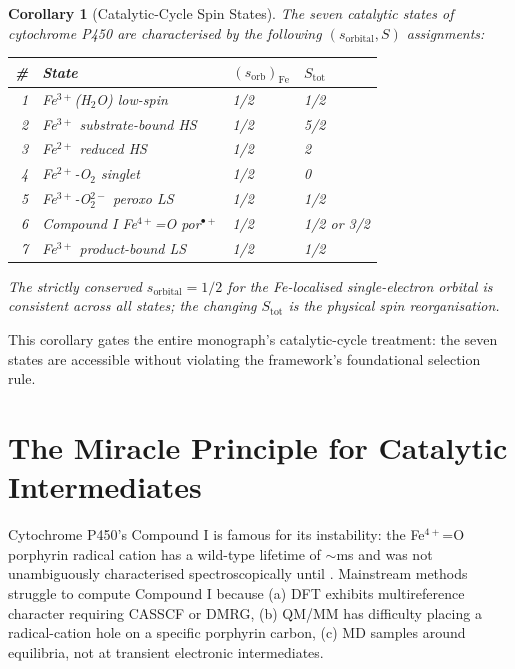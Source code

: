 \documentclass[11pt,twocolumn,a4paper]{article}
\newtheorem{corollary}[theorem]{Corollary}
\theoremstyle{definition}
\theoremstyle{remark}
\begin{document}
\begin{corollary}[Catalytic-Cycle Spin States]
\label{cor:cycle_spins}
The seven catalytic states of cytochrome P450 are characterised by the following $(s_{\mathrm{orbital}}, S)$ assignments:
\begin{center}
\small
\begin{tabular}{rlll}
\toprule
\# & State & $(s_{\mathrm{orb}})_{\mathrm{Fe}}$ & $S_{\mathrm{tot}}$ \\
\midrule
1 & Fe$^{3+}$(H$_2$O) low-spin & 1/2 & 1/2 \\
2 & Fe$^{3+}$ substrate-bound HS & 1/2 & 5/2 \\
3 & Fe$^{2+}$ reduced HS & 1/2 & 2 \\
4 & Fe$^{2+}$-O$_2$ singlet & 1/2 & 0 \\
5 & Fe$^{3+}$-O$_2^{2-}$ peroxo LS & 1/2 & 1/2 \\
6 & Compound I Fe$^{4+}$=O por$^{\bullet+}$ & 1/2 & 1/2 or 3/2 \\
7 & Fe$^{3+}$ product-bound LS & 1/2 & 1/2 \\
\bottomrule
\end{tabular}
\end{center}
The strictly conserved $s_{\mathrm{orbital}} = 1/2$ for the Fe-localised single-electron orbital is consistent across all states; the changing $S_{\mathrm{tot}}$ is the physical spin reorganisation.
\end{corollary}

This corollary gates the entire monograph's catalytic-cycle treatment: the seven states are accessible without violating the framework's foundational selection rule.

\section{The Miracle Principle for Catalytic Intermediates}
\label{sec:miracle}

Cytochrome P450's Compound I is famous for its instability: the Fe$^{4+}$=O porphyrin radical cation has a wild-type lifetime of $\sim$ms and was not unambiguously characterised spectroscopically until \citep{rittle2010}. Mainstream methods struggle to compute Compound I because (a) DFT exhibits multireference character requiring CASSCF or DMRG, (b) QM/MM has difficulty placing a radical-cation hole on a specific porphyrin carbon, (c) MD samples around equilibria, not at transient electronic intermediates.
\end{document}
